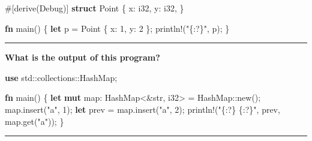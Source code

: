 \documentclass[
  11pt,
]{article}
\newenvironment{Shaded}{}{}
\newcommand{\AttributeTok}[1]{\textcolor[rgb]{0.49,0.56,0.16}{#1}}
\newcommand{\BuiltInTok}[1]{\textcolor[rgb]{0.00,0.50,0.00}{#1}}
\newcommand{\DataTypeTok}[1]{\textcolor[rgb]{0.56,0.13,0.00}{#1}}
\newcommand{\DecValTok}[1]{\textcolor[rgb]{0.25,0.63,0.44}{#1}}
\newcommand{\KeywordTok}[1]{\textcolor[rgb]{0.00,0.44,0.13}{\textbf{#1}}}
\newcommand{\NormalTok}[1]{#1}
\newcommand{\OperatorTok}[1]{\textcolor[rgb]{0.40,0.40,0.40}{#1}}
\newcommand{\PreprocessorTok}[1]{\textcolor[rgb]{0.74,0.48,0.00}{#1}}
\newcommand{\StringTok}[1]{\textcolor[rgb]{0.25,0.44,0.63}{#1}}
\begin{document}
\begin{Shaded}
\begin{Highlighting}[]
\AttributeTok{\#[}\NormalTok{derive}\AttributeTok{(}\BuiltInTok{Debug}\AttributeTok{)]}
\KeywordTok{struct}\NormalTok{ Point }\OperatorTok{\{}
\NormalTok{    x}\OperatorTok{:} \DataTypeTok{i32}\OperatorTok{,}
\NormalTok{    y}\OperatorTok{:} \DataTypeTok{i32}\OperatorTok{,}
\OperatorTok{\}}

\KeywordTok{fn}\NormalTok{ main() }\OperatorTok{\{}
    \KeywordTok{let}\NormalTok{ p }\OperatorTok{=}\NormalTok{ Point }\OperatorTok{\{}\NormalTok{ x}\OperatorTok{:} \DecValTok{1}\OperatorTok{,}\NormalTok{ y}\OperatorTok{:} \DecValTok{2} \OperatorTok{\};}
    \PreprocessorTok{println!}\NormalTok{(}\StringTok{"\{:?\}"}\OperatorTok{,}\NormalTok{ p)}\OperatorTok{;}
\OperatorTok{\}}
\end{Highlighting}
\end{Shaded}

\begin{center}\rule{0.5\linewidth}{0.5pt}\end{center}

\textbf{What is the output of this program?}

\begin{Shaded}
\begin{Highlighting}[]
\KeywordTok{use} \PreprocessorTok{std::collections::}\NormalTok{HashMap}\OperatorTok{;}

\KeywordTok{fn}\NormalTok{ main() }\OperatorTok{\{}
    \KeywordTok{let} \KeywordTok{mut}\NormalTok{ map}\OperatorTok{:}\NormalTok{ HashMap}\OperatorTok{\textless{}\&}\DataTypeTok{str}\OperatorTok{,} \DataTypeTok{i32}\OperatorTok{\textgreater{}} \OperatorTok{=} \PreprocessorTok{HashMap::}\NormalTok{new()}\OperatorTok{;}
\NormalTok{    map}\OperatorTok{.}\NormalTok{insert(}\StringTok{"a"}\OperatorTok{,} \DecValTok{1}\NormalTok{)}\OperatorTok{;}
    \KeywordTok{let}\NormalTok{ prev }\OperatorTok{=}\NormalTok{ map}\OperatorTok{.}\NormalTok{insert(}\StringTok{"a"}\OperatorTok{,} \DecValTok{2}\NormalTok{)}\OperatorTok{;}
    \PreprocessorTok{println!}\NormalTok{(}\StringTok{"\{:?\} \{:?\}"}\OperatorTok{,}\NormalTok{ prev}\OperatorTok{,}\NormalTok{ map}\OperatorTok{.}\NormalTok{get(}\StringTok{"a"}\NormalTok{))}\OperatorTok{;}
\OperatorTok{\}}
\end{Highlighting}
\end{Shaded}

\begin{center}\rule{0.5\linewidth}{0.5pt}\end{center}
\end{document}
